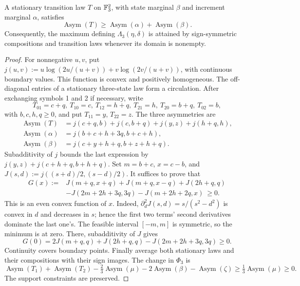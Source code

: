 \begin{lemma}\label{lem:baa-ternary-sign}
A stationary transition law $T$ on $\mathbb F_3^2$, with state marginal
$\beta$ and increment marginal $\alpha$, satisfies
\[
 \operatorname{Asym}(T)\ge
       \operatorname{Asym}(\alpha)+\operatorname{Asym}(\beta).
\]
Consequently, the maximum defining $\Lambda_3(\eta,\delta)$ is attained
by sign-symmetric compositions and transition laws whenever its domain is nonempty.
\end{lemma}
\begin{proof}
For nonnegative $u,v$, put
$j(u,v):=u\log(2u/(u+v))+v\log(2v/(u+v))$, with continuous boundary
values. This function is convex and positively homogeneous.
The off-diagonal entries of a stationary three-state law form a circulation.
After exchanging symbols 1 and 2 if necessary, write
\[
 T_{01}=c+q,\ T_{10}=c,\ T_{12}=h+q,\ T_{21}=h,
 \ T_{20}=b+q,\ T_{02}=b,
\]
with $b,c,h,q\ge0$, and put $T_{11}=y$, $T_{22}=z$.
The three asymmetries are
\begin{align*}
 \operatorname{Asym}(T)&=j(c+q,b)+j(c,b+q)+j(y,z)+j(h+q,h),\\
 \operatorname{Asym}(\alpha)&=j(b+c+h+3q,b+c+h),\\
 \operatorname{Asym}(\beta)&=j(c+y+h+q,b+z+h+q).
\end{align*}
Subadditivity of $j$ bounds the last expression by
$j(y,z)+j(c+h+q,b+h+q)$.
Set $m=b+c$, $x=c-b$, and $J(s,d):=j((s+d)/2,(s-d)/2)$.
It suffices to prove that
\begin{align*}
 G(x):={}&J(m+q,x+q)+J(m+q,x-q)+J(2h+q,q)\\
        &-J(2m+2h+3q,3q)-J(m+2h+2q,x)
 \ \ge0.
\end{align*}
This is an even convex function of $x$. Indeed,
$\partial_d^2J(s,d)=s/(s^2-d^2)$ is convex in $d$ and decreases in $s$;
hence the first two terms' second derivatives dominate the last one's.
The feasible interval $[-m,m]$ is symmetric, so the minimum is at zero.
There, subadditivity of $J$ gives
\[
 G(0)=2J(m+q,q)+J(2h+q,q)-J(2m+2h+3q,3q)\ge0.
\]
Continuity covers boundary points. Finally average both stationary laws
and their compositions with their sign images. The change in $\Phi_3$ is
\[
 \operatorname{Asym}(T_1)+\operatorname{Asym}(T_2)
 -\tfrac23\operatorname{Asym}(\mu)-2\operatorname{Asym}(\beta)
 -\operatorname{Asym}(\zeta)\ge\tfrac13\operatorname{Asym}(\mu)\ge0.
\]
The support constraints are preserved.
\end{proof}

